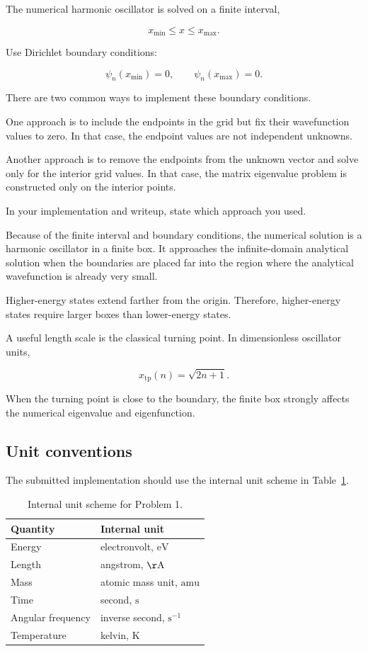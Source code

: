 The numerical harmonic oscillator is solved on a finite interval,

\[
x_{\min}\le x\le x_{\max}.
\]

Use Dirichlet boundary conditions:

\[
\psi_n(x_{\min})=0,
\qquad
\psi_n(x_{\max})=0.
\]

There are two common ways to implement these boundary conditions.

One approach is to include the endpoints in the grid but fix their wavefunction values to zero. In that case, the endpoint values are not independent unknowns.

Another approach is to remove the endpoints from the unknown vector and solve only for the interior grid values. In that case, the matrix eigenvalue problem is constructed only on the interior points.

In your implementation and writeup, state which approach you used.

Because of the finite interval and boundary conditions, the numerical solution is a harmonic oscillator in a finite box. It approaches the infinite-domain analytical solution when the boundaries are placed far into the region where the analytical wavefunction is already very small.

Higher-energy states extend farther from the origin. Therefore, higher-energy states require larger boxes than lower-energy states.

A useful length scale is the classical turning point. In dimensionless oscillator units,

\[
x_{\mathrm{tp}}(n)
=
\sqrt{2n+1}.
\]

When the turning point is close to the boundary, the finite box strongly affects the numerical eigenvalue and eigenfunction.

\subsection{Unit conventions}

The submitted implementation should use the internal unit scheme in Table~\ref{tab:qho-unit-scheme}.

\begin{table}[h]
\centering
\caption{Internal unit scheme for Problem 1.}
\label{tab:qho-unit-scheme}
\begin{tabularx}{\textwidth}{lX}
\toprule
Quantity            & Internal unit \\
\midrule
Energy              & electronvolt, \(\mathrm{eV}\) \\
Length              & angstrom, \(\mathrm{\AA}\) \\
Mass                & atomic mass unit, \(\mathrm{amu}\) \\
Time                & second, \(\mathrm{s}\) \\
Angular frequency   & inverse second, \(\mathrm{s}^{-1}\) \\
Temperature         & kelvin, \(\mathrm{K}\) \\
\bottomrule
\end{tabularx}
\end{table}

